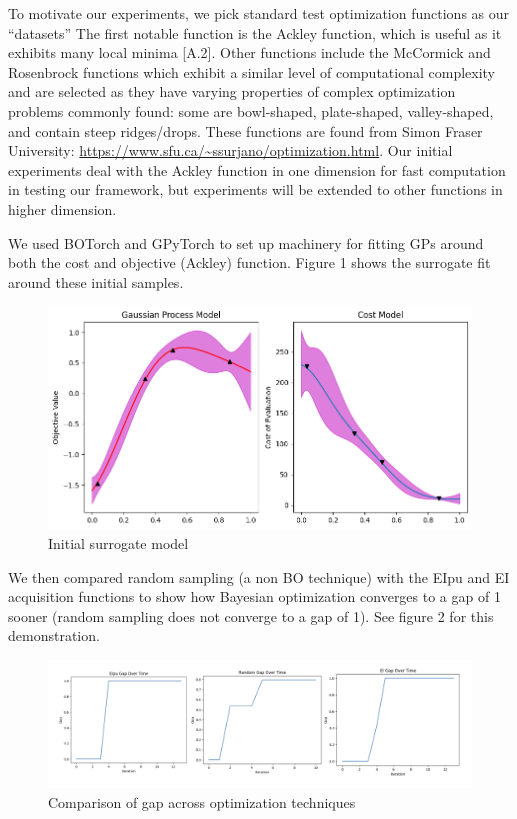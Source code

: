 \documentclass{article}
\begin{document}
To motivate our experiments, we pick standard test optimization functions as our ``datasets'' The first notable function is the Ackley function, which is useful as it exhibits many local minima [A.2]. Other functions include the McCormick and Rosenbrock functions which exhibit a similar level of computational complexity and are selected as they have varying properties of complex optimization problems commonly found: some are bowl-shaped, plate-shaped, valley-shaped, and contain steep ridges/drops. These functions are found from Simon Fraser University: \url{https://www.sfu.ca/~ssurjano/optimization.html}. Our initial experiments deal with the Ackley function in one dimension for fast computation in testing our framework, but experiments will be extended to other functions in higher dimension.

We used BOTorch and GPyTorch to set up machinery for fitting GPs around both the cost and objective (Ackley) function. Figure 1 shows the surrogate fit around these initial samples.

\begin{figure}
    \centering
    \includegraphics[width=0.7\linewidth]{graphics/gp_cost.png}
    \caption{Initial surrogate model}
\end{figure}

We then compared random sampling (a non BO technique) with the EIpu and EI acquisition functions to show how Bayesian optimization converges to a gap of 1 sooner (random sampling does not converge to a gap of 1). See figure 2 for this demonstration.

\begin{figure}
    \centering
    \includegraphics[width=1\linewidth]{graphics/gaps.png}
    \caption{Comparison of gap across optimization techniques}
\end{figure}
\end{document}
